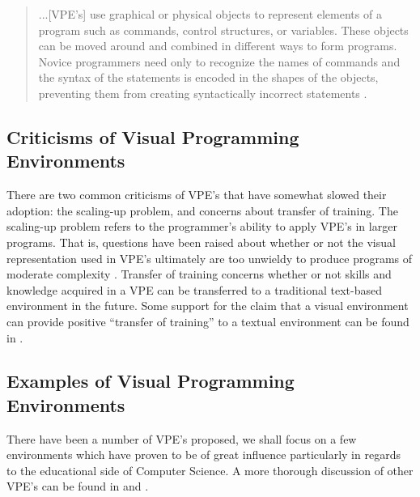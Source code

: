 \begin{quotation}
...[VPE's] use graphical or physical objects to represent elements of a program such as commands, control structures, or variables. These objects can be moved around and combined in different ways to form programs. Novice programmers need only to recognize the names of commands and the syntax of the statements is encoded in the shapes of the objects, preventing them from creating syntactically incorrect statements \cite{Kelleher05}.
\end{quotation}

\subsection{Criticisms of Visual Programming Environments}

There are two common criticisms of VPE's that have somewhat slowed their adoption: the scaling-up problem, and concerns about transfer of training.  The scaling-up problem refers to the programmer's ability to apply VPE's in larger programs.  That is, questions have been raised about whether or not the visual representation used in VPE's ultimately are too unwieldy to produce programs of moderate complexity \cite{Burnett94}.  Transfer of training concerns whether or not skills and knowledge acquired in a VPE can be transferred to a traditional text-based environment in the future.  Some support for the claim that a visual environment can provide positive ``transfer of training'' to a textual environment can be found in \cite{Hundhausen09}.

\subsection{Examples of Visual Programming Environments}

There have been a number of VPE's proposed, we shall focus on a few environments which have proven to be of great influence particularly in regards to the educational side of Computer Science.  A more thorough discussion of other VPE's can be found in \cite{Kelso02} and \cite{Kelleher05}.

